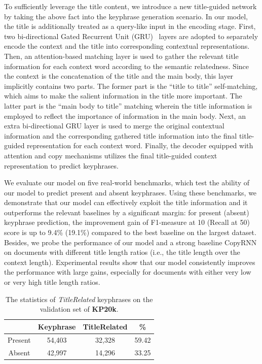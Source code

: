 \documentclass[letterpaper]{article} %
\begin{document}
To sufficiently leverage the title content, we introduce a new title-guided network by taking the above fact into the keyphrase generation scenario. In our model, the title is additionally treated as a query-like input in the encoding stage. First, two bi-directional Gated Recurrent Unit (GRU)~\cite{cho2014learning} layers are adopted to separately encode the context and the title into corresponding contextual representations. Then, an attention-based matching layer is used to gather the relevant title information for each context word according to the semantic relatedness. Since the context is the concatenation of the title and the main body, this layer implicitly contains two parts. The former part is the ``title to title'' self-matching, which aims to make the salient information in the title more important. The latter part is the ``main body to title'' matching wherein the title information is employed to reflect the importance of information in the main body. Next, an extra bi-directional GRU layer is used to merge the original contextual information and the corresponding gathered title information into the final title-guided representation for each context word. Finally, the decoder equipped with attention and copy mechanisms utilizes the final title-guided context representation to predict keyphrases. 

We evaluate our model on five real-world benchmarks, which test the ability of our model to predict present and absent keyphrases. Using these benchmarks, we demonstrate that our model can effectively exploit the title information and it outperforms the relevant baselines by a significant margin: for present (absent) keyphrase prediction, the improvement gain of F1-measure at 10 (Recall at 50) score is up to 9.4\% (19.1\%) compared to the best baseline on the largest dataset. Besides, we probe the performance of our model and a strong baseline CopyRNN on documents with different title length ratios (i.e., the title length over the context length). Experimental results show that our model consistently improves the performance with large gains, especially for documents with either very low or very high title length ratios.

\begin{table}[t]
\centering
\begin{tabular}{ c c c c}
\hline
\hline
 & Keyphrase & TitleRelated & \% \\
\hline
Present & 54,403 & 32,328 & 59.42 \\
\hline
Absent & 42,997  & 14,296 & 33.25\\
\hline
\end{tabular}
\caption{The statistics of \textit{TitleRelated} keyphrases on the validation set of \textbf{KP20k}.}
\label{table:statistic_study_on_val_set}
\end{table}
\end{document}
